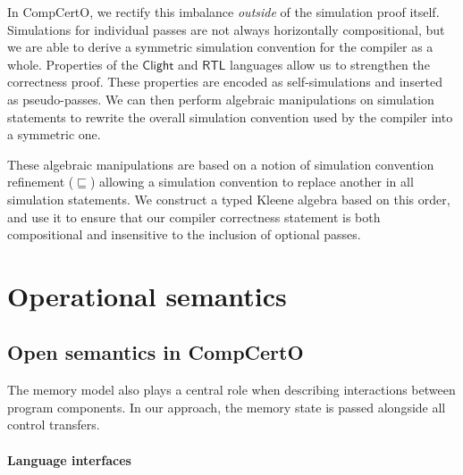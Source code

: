 \documentclass[11pt,oneside,draft]{book}
\theoremstyle{definition}
\newcommand{\kw}[1]{\ensuremath{ \mathsf{#1} }}
\newcommand{\scref}{\sqsubseteq} %
\begin{document}
In CompCertO,
we rectify this imbalance \emph{outside}
of the simulation proof itself.
Simulations for individual passes are not always
horizontally compositional,
but we are able to derive a symmetric simulation convention
for the compiler as a whole.
Properties of the $\kw{Clight}$ and $\kw{RTL}$ languages
allow us to strengthen the correctness proof.
These properties are encoded as self-simulations
and inserted as pseudo-passes.
We can then perform algebraic manipulations
on simulation statements
to rewrite the overall simulation convention
used by the compiler into a symmetric one.

These algebraic manipulations are
based on a notion of
simulation convention refinement ($\scref$)
allowing a simulation convention
to replace another in all simulation statements.
We construct a typed Kleene algebra \citep{tka}
based on this order,
and use it to ensure that
our compiler correctness statement
is both compositional
and insensitive to the inclusion of optional passes.



\section{Operational semantics} \label{sec:sem} %


\subsection{Open semantics in CompCertO} \label{sec:sem:open} %

The memory model also plays a central role
when describing interactions between program components.
In our approach, %
the memory state is passed %
alongside all control transfers.

\paragraph{Language interfaces} %
\end{document}
